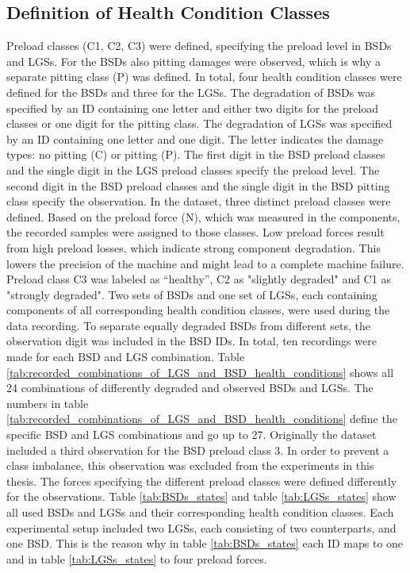 \subsection{Definition of Health Condition Classes}
Preload classes (C1, C2, C3) were defined, specifying the preload level in BSDs and LGSs. For the BSDs also pitting damages were observed, which is why a separate pitting class (P) was defined. In total, four health condition classes were defined for the BSDs and three for the LGSs. The degradation of BSDs was specified by an ID containing one letter and either two digits for the preload classes or one digit for the pitting class. The degradation of LGSs was specified by an ID containing one letter and one digit. The letter indicates the damage types: no pitting (C) or pitting (P). The first digit in the BSD preload classes and the single digit in the LGS preload classes specify the preload level. The second digit in the BSD preload classes and the single digit in the BSD pitting class specify the observation. In the dataset, three distinct preload classes were defined. Based on the preload force (N), which was measured in the components, the recorded samples were assigned to those classes. Low preload forces result from high preload losses, which indicate strong component degradation. This lowers the precision of the machine and might lead to a complete machine failure. Preload class C3 was labeled as “healthy”, C2 as "slightly degraded" and C1 as "strongly degraded". Two sets of BSDs and one set of LGSs, each containing components of all corresponding health condition classes, were used during the data recording. To separate equally degraded BSDs from different sets, the observation digit was included in the BSD IDs. In total, ten recordings were made for each BSD and LGS combination. Table \ref{tab:recorded_combinations_of_LGS_and_BSD_health_conditions} shows all 24 combinations of differently degraded and observed BSDs and LGSs. The numbers in table \ref{tab:recorded_combinations_of_LGS_and_BSD_health_conditions} define the specific BSD and LGS combinations and go up to 27. Originally the dataset included a third observation for the BSD preload class 3. In order to prevent a class imbalance, this observation was excluded from the experiments in this thesis. The forces specifying the different preload classes were defined differently for the observations. Table \ref {tab:BSDs_states} and table \ref {tab:LGSs_states} show all used BSDs and LGSs and their corresponding health condition classes. Each experimental setup included two LGSs, each consisting of two counterparts, and one BSD. This is the reason why in table \ref {tab:BSDs_states} each ID maps to one and in table \ref {tab:LGSs_states} to four preload forces.

